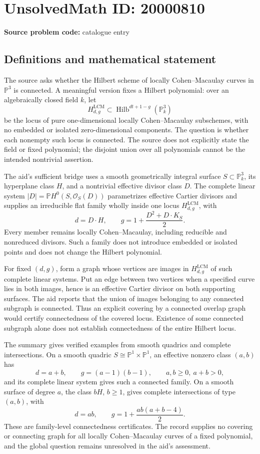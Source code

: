 \documentclass[11pt]{article}
\newcommand{\PP}{\mathbb{P}}
\begin{document}
\section*{UnsolvedMath ID: 20000810}
\textbf{Source problem code:} catalogue entry
\subsection{Definitions and mathematical statement}
The source asks whether the Hilbert scheme of locally Cohen--Macaulay curves in $\PP^3$ is connected. A meaningful version fixes a Hilbert polynomial: over an algebraically closed field $k$, let
\[
 H_{d,g}^{\mathrm{LCM}}\subset\operatorname{Hilb}^{dt+1-g}(\PP^3_k)
\]
be the locus of pure one-dimensional locally Cohen--Macaulay subschemes, with no embedded or isolated zero-dimensional components. The question is whether each nonempty such locus is connected. The source does not explicitly state the field or fixed polynomial; the disjoint union over all polynomials cannot be the intended nontrivial assertion.

The aid's sufficient bridge uses a smooth geometrically integral surface $S\subset\PP^3_k$, its hyperplane class $H$, and a nontrivial effective divisor class $D$. The complete linear system $|D|=\PP H^0(S,\mathcal O_S(D))$ parametrizes effective Cartier divisors and supplies an irreducible flat family wholly inside one locus $H_{d,g}^{\mathrm{LCM}}$, with
\[
 d=D\cdot H,\qquad
 g=1+\frac{D^2+D\cdot K_S}{2}.
\]
Every member remains locally Cohen--Macaulay, including reducible and nonreduced divisors. Such a family does not introduce embedded or isolated points and does not change the Hilbert polynomial.

For fixed $(d,g)$, form a graph whose vertices are images in $H_{d,g}^{\mathrm{LCM}}$ of such complete linear systems. Put an edge between two vertices when a specified curve lies in both images, hence is an effective Cartier divisor on both supporting surfaces. The aid reports that the union of images belonging to any connected subgraph is connected. Thus an explicit covering by a connected overlap graph would certify connectedness of the covered locus. Existence of some connected subgraph alone does not establish connectedness of the entire Hilbert locus.

The summary gives verified examples from smooth quadrics and complete intersections. On a smooth quadric $S\cong\PP^1\times\PP^1$, an effective nonzero class $(a,b)$ has
\[
 d=a+b,\qquad g=(a-1)(b-1),\qquad a,b\geq0,\ a+b>0,
\]
and its complete linear system gives such a connected family. On a smooth surface of degree $a$, the class $bH$, $b\geq1$, gives complete intersections of type $(a,b)$, with
\[
 d=ab,\qquad g=1+\frac{ab(a+b-4)}2.
\]
These are family-level connectedness certificates. The record supplies no covering or connecting graph for all locally Cohen--Macaulay curves of a fixed polynomial, and the global question remains unresolved in the aid's assessment.
\end{document}

